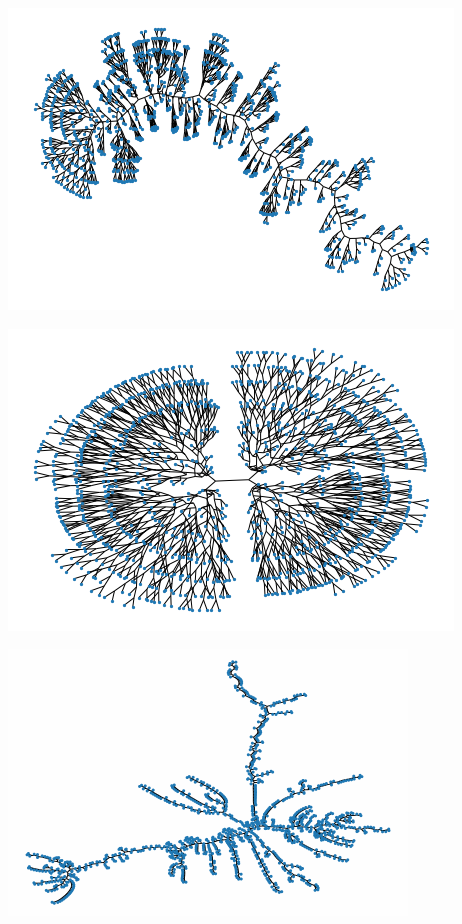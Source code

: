 \documentclass[12pt,twoside]{report}
\begin{document}
\begin{center}
\begin{minipage}{0.45\linewidth}
\includegraphics[width=\linewidth]{figures/er_dendro.png}
\end{minipage}%
\hfill
\begin{minipage}{0.45\linewidth}
\includegraphics[width=\linewidth]{figures/fractal_dendro.png}
\end{minipage}%
\hfill
\begin{minipage}{0.45\linewidth}
\includegraphics[width=\linewidth]{figures/uvl_dendro.png}

\end{minipage}
\end{center}
\end{document}
